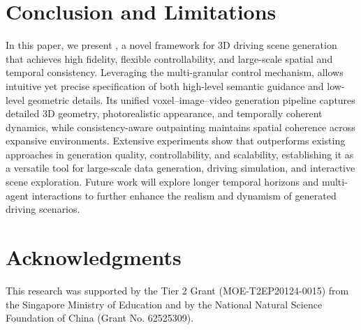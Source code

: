 \section{Conclusion and Limitations}
In this paper, we present {\method}, a novel framework for 3D driving scene generation that achieves high fidelity, flexible controllability, and large-scale spatial and temporal consistency. Leveraging the multi-granular control mechanism, {\method} allows intuitive yet precise specification of both high-level semantic guidance and low-level geometric details. Its unified voxel–image–video generation pipeline captures detailed 3D geometry, photorealistic appearance, and temporally coherent dynamics, while consistency-aware outpainting maintains spatial coherence across expansive environments. Extensive experiments show that {\method} outperforms existing approaches in generation quality, controllability, and scalability, establishing it as a versatile tool for large-scale data generation, driving simulation, and interactive scene exploration. Future work will explore longer temporal horizons and multi-agent interactions to further enhance the realism and dynamism of generated driving scenarios.

\section{Acknowledgments}
This research was supported by the Tier 2 Grant (MOE-T2EP20124-0015) from the Singapore Ministry of Education and by the National Natural Science Foundation of China (Grant No. 62525309).
